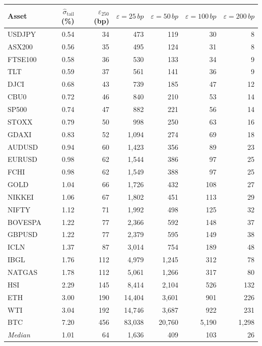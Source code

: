 \begin{tabular}{lrrrrrr}
\toprule
Asset & $\hat{\sigma}_{\mathrm{tail}}$ (\%) & $\varepsilon_{250}$ (bp) & $\varepsilon{=}25\,bp$ & $\varepsilon{=}50\,bp$ & $\varepsilon{=}100\,bp$ & $\varepsilon{=}200\,bp$ \\
\midrule
  USDJPY & 0.54 & 34 & 473 & 119 & 30 & 8 \\
  ASX200 & 0.56 & 35 & 495 & 124 & 31 & 8 \\
  FTSE100 & 0.58 & 36 & 530 & 133 & 34 & 9 \\
  TLT & 0.59 & 37 & 561 & 141 & 36 & 9 \\
  DJCI & 0.68 & 43 & 739 & 185 & 47 & 12 \\
  CBU0 & 0.72 & 46 & 840 & 210 & 53 & 14 \\
  SP500 & 0.74 & 47 & 882 & 221 & 56 & 14 \\
  STOXX & 0.79 & 50 & 998 & 250 & 63 & 16 \\
  GDAXI & 0.83 & 52 & 1{,}094 & 274 & 69 & 18 \\
  AUDUSD & 0.94 & 60 & 1{,}423 & 356 & 89 & 23 \\
  EURUSD & 0.98 & 62 & 1{,}544 & 386 & 97 & 25 \\
  FCHI & 0.98 & 62 & 1{,}549 & 388 & 97 & 25 \\
  GOLD & 1.04 & 66 & 1{,}726 & 432 & 108 & 27 \\
  NIKKEI & 1.06 & 67 & 1{,}802 & 451 & 113 & 29 \\
  NIFTY & 1.12 & 71 & 1{,}992 & 498 & 125 & 32 \\
  BOVESPA & 1.22 & 77 & 2{,}366 & 592 & 148 & 37 \\
  GBPUSD & 1.22 & 77 & 2{,}379 & 595 & 149 & 38 \\
  ICLN & 1.37 & 87 & 3{,}014 & 754 & 189 & 48 \\
  IBGL & 1.76 & 112 & 4{,}979 & 1{,}245 & 312 & 78 \\
  NATGAS & 1.78 & 112 & 5{,}061 & 1{,}266 & 317 & 80 \\
  HSI & 2.29 & 145 & 8{,}414 & 2{,}104 & 526 & 132 \\
  ETH & 3.00 & 190 & 14{,}404 & 3{,}601 & 901 & 226 \\
  WTI & 3.04 & 192 & 14{,}746 & 3{,}687 & 922 & 231 \\
  BTC & 7.20 & 456 & 83{,}038 & 20{,}760 & 5{,}190 & 1{,}298 \\
\midrule
  \textit{Median} & 1.01 & 64 & 1{,}636 & 409 & 103 & 26 \\
\bottomrule
\end{tabular}